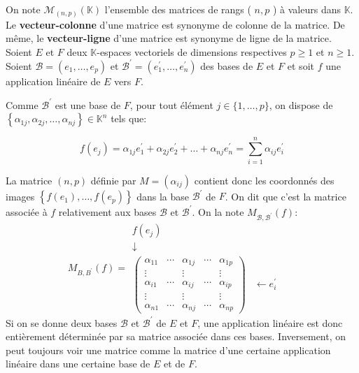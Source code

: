 On note $\mathcal{M}_{(n, p)}(\mathbb{K})$ l'ensemble des matrices de rangs ( $n, p$ ) à valeurs dans $\mathbb{K}$. Le {\bf vecteur-colonne} d'une matrice est synonyme de colonne de la matrice. De même, le {\bf vecteur-ligne} d'une matrice est synonyme de ligne de la matrice.\\

Soient $E$ et $F$ deux $\mathbb{K}$-espaces vectoriels de dimensions respectives $p \geq 1$ et $n \geq 1$. Soient $\mathcal{B}=\left(e_1, \ldots, e_p\right)$ et $\mathcal{B}^{\prime}=\left(e_1^{\prime}, \ldots, e_n^{\prime}\right)$ des bases de $E$ et $F$ et soit $f$ une application linéaire de $E$ vers $F$.

Comme $\mathcal{B}^{\prime}$ est une base de $F$, pour tout élément $j \in\{1, \ldots, p\}$, on dispose de $\left\{\alpha_{1 j}, \alpha_{2 j}, \ldots, \alpha_{n j}\right\} \in \mathbb{K}^n$ tels que:

$$
f\left(e_j\right)=\alpha_{1 j} e_1^{\prime}+\alpha_{2 j} e_2^{\prime}+\ldots+\alpha_{n j} e_n^{\prime}=\sum_{i=1}^n \alpha_{i j} e_i^{\prime}
$$


La matrice $(n, p)$ définie par $M=\left(\alpha_{i j}\right)$ contient donc les coordonnés des images $\left\{f\left(e_1\right), \ldots, f\left(e_p\right)\right\}$ dans la base $\mathcal{B}^{\prime}$ de $F$. On dit que c'est la matrice associée à $f$ relativement aux bases $\mathcal{B}$ et $\mathcal{B}^{\prime}$. On la note $M_{\mathcal{B}, \mathcal{B}^{\prime}}(f)$:
$$
M_{B, B^{\prime}}(f)=
    \begin{array}{ccccc}
    f\left(e_j\right) & &  \\
    \downarrow & &  &  \\
    \left(\begin{array}{ccccc}
    \alpha_{11} & \cdots & \alpha_{1 j} & \cdots & \alpha_{1 p} \\
    \vdots & & \vdots & & \vdots \\
    \alpha_{i 1} & \cdots & \alpha_{i j} & \cdots & \alpha_{i p} \\
    \vdots & & \vdots & & \vdots \\
    \alpha_{n 1} & \cdots & \alpha_{n j} & \cdots & \alpha_{n p}
    \end{array}\right) & \leftarrow e_i^{\prime}
    \end{array}
   $$
Si on se donne deux bases $\mathcal{B}$ et $\mathcal{B}^{\prime}$ de $E$ et $F$, une application linéaire est donc entièrement déterminée par sa matrice associée dans ces bases.
Inversement, on peut toujours voir une matrice comme la matrice d'une certaine application linéaire dans une certaine base de $E$ et de $F$.\\

